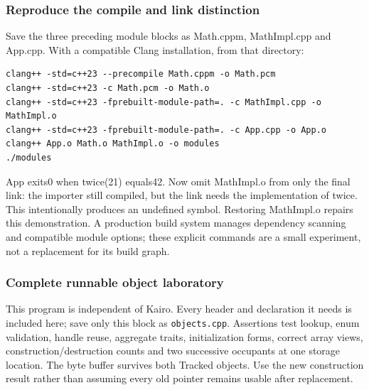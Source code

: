 \subsubsection{Reproduce the compile and link distinction}\label{reproduce-the-compile-and-link-distinction}

Save the three preceding module blocks as Math.cppm, MathImpl.cpp and App.cpp. With a compatible Clang installation, from that directory:

\begin{verbatim}
clang++ -std=c++23 --precompile Math.cppm -o Math.pcm
clang++ -std=c++23 -c Math.pcm -o Math.o
clang++ -std=c++23 -fprebuilt-module-path=. -c MathImpl.cpp -o MathImpl.o
clang++ -std=c++23 -fprebuilt-module-path=. -c App.cpp -o App.o
clang++ App.o Math.o MathImpl.o -o modules
./modules
\end{verbatim}

App exits0 when twice(21) equals42. Now omit MathImpl.o from only the final link: the importer still compiled, but the link needs the implementation of twice. This intentionally produces an undefined symbol. Restoring MathImpl.o repairs this demonstration. A production build system manages dependency scanning and compatible module options; these explicit commands are a small experiment, not a replacement for its build graph.

\subsubsection{Complete runnable object laboratory}\label{complete-runnable-object-laboratory}

This program is independent of Kairo. Every header and declaration it needs is included here; save only this block as \texttt{objects.cpp}. Assertions test lookup, enum validation, handle reuse, aggregate traits, initialization forms, correct array views, construction/destruction counts and two successive occupants at one storage location. The byte buffer survives both Tracked objects. Use the new construction result rather than assuming every old pointer remains usable after replacement.

